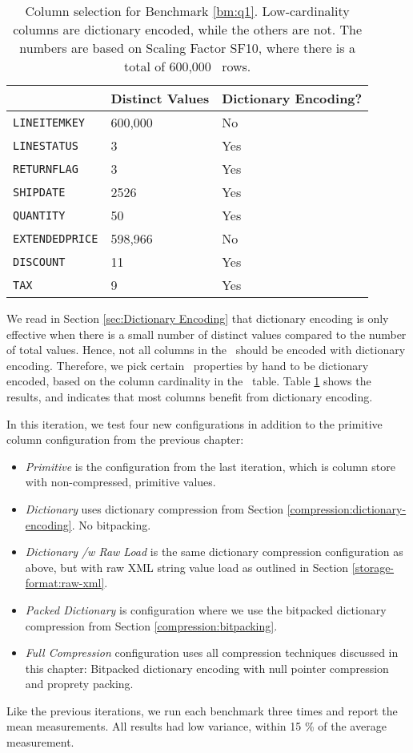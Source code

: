 \begin{table}
    \begin{tabularx}{\textwidth}{X | X X}
        & Distinct Values & Dictionary Encoding? \\ 
        \hline
        \hline
        \texttt{LINEITEMKEY} & 600,000 & No \\
        \texttt{LINESTATUS} & 3 & Yes \\
        \texttt{RETURNFLAG} & 3 & Yes \\
        \texttt{SHIPDATE} & 2526 & Yes \\
        \texttt{QUANTITY} & 50 & Yes \\
        \texttt{EXTENDEDPRICE} & 598,966 & No \\
        \texttt{DISCOUNT} & 11 & Yes \\
        \texttt{TAX} & 9 & Yes
    \end{tabularx}
    \caption{Column selection for Benchmark \ref{bm:q1}. Low-cardinality columns are dictionary encoded, while the others are not. The numbers are based on Scaling Factor SF10, where there is a total of 600,000 \lineitem~rows.}
    \label{tab:column-selection}
\end{table}

We read in Section \ref{sec:Dictionary Encoding} that dictionary encoding is only effective when there is a small number of distinct values compared to the number of total values. Hence, not all columns in the \tpchdl~should be encoded with dictionary encoding. Therefore, we pick certain \lineitem~properties by hand to be dictionary encoded, based on the column cardinality in the \lineitem~table. Table \ref{tab:column-selection} shows the results, and indicates that most columns benefit from dictionary encoding.

In this iteration, we test four new configurations in addition to the primitive column configuration from the previous chapter:
\begin{itemize}
    \item \textit{Primitive} is the configuration from the last iteration, which is column store with non-compressed, primitive values.
    \item \textit{Dictionary} uses dictionary compression from Section \ref{compression:dictionary-encoding}. No bitpacking.
    \item \textit{Dictionary /w Raw Load} is the same dictionary compression configuration as above, but with raw XML string value load as outlined in Section \ref{storage-format:raw-xml}.
    \item \textit{Packed Dictionary} is configuration where we use the bitpacked dictionary compression from Section \ref{compression:bitpacking}.
    \item \textit{Full Compression} configuration uses all compression techniques discussed in this chapter: Bitpacked dictionary encoding with null pointer compression and proprety packing.
\end{itemize}
Like the previous iterations, we run each benchmark three times and report the mean measurements. All results had low variance, within 15 \% of the average measurement.

